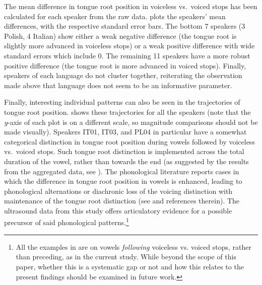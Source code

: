 \documentclass[12pt,]{article}
\let\rmarkdownfootnote\footnote%
\def\footnote{\protect\rmarkdownfootnote}
\begin{document}
The mean difference in tongue root position in voiceless vs.~voiced
stops has been calculated for each speaker from the raw data.
 plots the speakers' mean differences, with the
respective standard error bars. The bottom 7 speakers (3 Polish, 4
Italian) show either a weak negative difference (the tongue root is
slightly more advanced in voiceless stops) or a weak positive difference
with wide standard errors which include 0. The remaining 11 speakers
have a more robust positive difference (the tongue root is more advanced
in voiced stops). Finally, speakers of each language do not cluster
together, reiterating the observation made above that language does not
seem to be an informative parameter.

Finally, interesting individual patterns can also be seen in the
trajectories of tongue root position.  shows
these trajectories for all the speakers (note that the \emph{y}-axis of
each plot is on a different scale, so magnitude comparisons should not
be made visually). Speakers IT01, IT03, and PL04 in particular have a
somewhat categorical distinction in tongue root position during vowels
followed by voiceless vs.~voiced stops. Such tongue root distinction is
implemented across the total duration of the vowel, rather than towards
the end (as suggested by the results from the aggregated data, see
). The phonological literature reports cases in which the
difference in tongue root position in vowels is enhanced, leading to
phonological alternations or diachronic loss of the voicing distinction
with maintenance of the tongue root distinction (see \citealt{vaux1996}
and references therein). The ultrasound data from this study offers
articulatory evidence for a possible precursor of said phonological
patterns.\footnote{All the examples in \citet{vaux1996} are on vowels \textit{following} voiceless vs. voiced stops, rather than preceding, as in the current study. While beyond the scope of this paper, whether this is a systematic gap or not and how this relates to the present findings should be examined in future work.}
\end{document}
